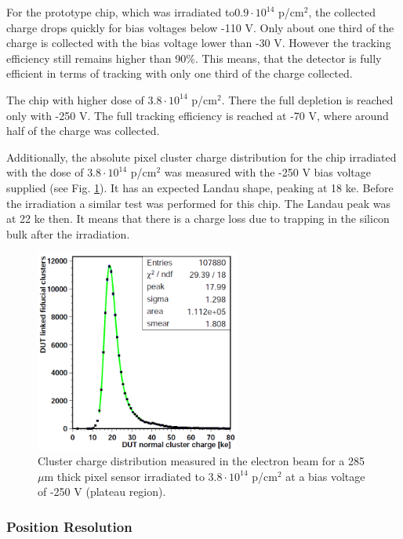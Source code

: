 For the prototype chip, which was irradiated to$0.9 \cdot 10^{14}$ p/cm$^2$, the collected charge drops quickly for bias voltages below -110 V. 
Only about one third of the charge is collected with the bias voltage lower than -30 V. However the tracking efficiency still remains higher
than 90\%. This means, that the detector is fully efficient in terms of tracking with only one third of the charge collected.

The chip with higher dose of $3.8 \cdot 10^{14}$ p/cm$^2$. There the full depletion is reached only with -250 V. The full tracking efficiency
is reached at -70 V, where around half of the charge was collected.

Additionally, the absolute pixel cluster charge distribution for the chip irradiated with the dose of $3.8 \cdot 10^{14}$ p/cm$^2$ was measured
with the -250 V bias voltage supplied (see Fig. \ref{fig:Landau}). It has an expected Landau shape, peaking at 18 ke. Before the irradiation a 
similar test was performed for this chip. The Landau peak was at 22 ke then. It means that there is a charge loss due to trapping in the silicon
bulk after the irradiation.

\begin{figure}[t]
 \centering
 \includegraphics[width=0.6\textwidth]{021_pixel_upgrade/plots/Landau.png}
 \caption{Cluster charge distribution measured in the electron beam for a 285$\mu$m thick pixel sensor irradiated to $3.8 \cdot 10^{14}$ p/cm$^2$ 
 at a bias voltage of -250 V (plateau region).}
 \label{fig:Landau}
\end{figure}

\subsubsection{Position Resolution}

